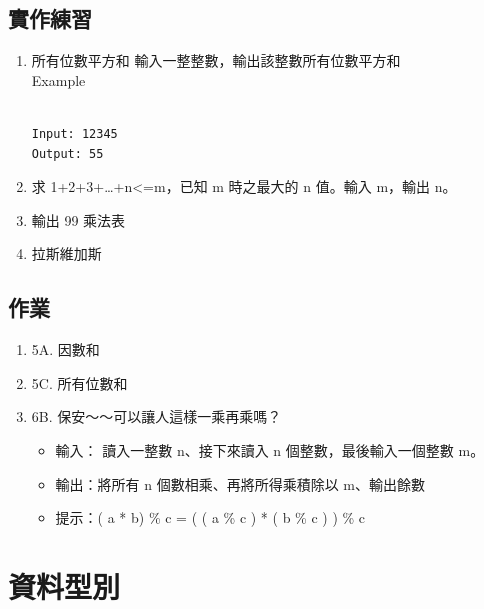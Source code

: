 \documentclass[a4paper,12pt]{article}
\begin{document}
\subsection{實作練習}
\label{sec:org616b840}
\begin{enumerate}
\item 所有位數平方和
\label{sec:org8abc150}
輸入一整整數，輸出該整數所有位數平方和\\
Example\\
\begin{verbatim}

Input: 12345
Output: 55
\end{verbatim}

\item 求 1+2+3+\ldots{}+n<=m，已知 m 時之最大的 n 值。輸入 m，輸出 n。
\label{sec:org1b5db55}
\item 輸出 99 乘法表
\label{sec:orgaa4a58e}
\item 拉斯維加斯
\label{sec:orge172202}
\end{enumerate}

\subsection{作業}
\label{sec:org3cee24f}
\begin{enumerate}
\item 5A. 因數和
\label{sec:org9a6fa15}

\item 5C. 所有位數和
\label{sec:org5ed1ca1}

\item 6B. 保安～～可以讓人這樣一乘再乘嗎？
\label{sec:org3158bb9}
\begin{itemize}
\item 輸入： 讀入一整數 n、接下來讀入 n 個整數，最後輸入一個整數 m。\\
\item 輸出：將所有 n 個數相乘、再將所得乘積除以 m、輸出餘數\\
\item 提示：( a * b) \% c = ( ( a \% c ) * ( b \% c ) ) \% c\\
\end{itemize}
\end{enumerate}

\section{資料型別}
\label{py-types}
\end{document}
